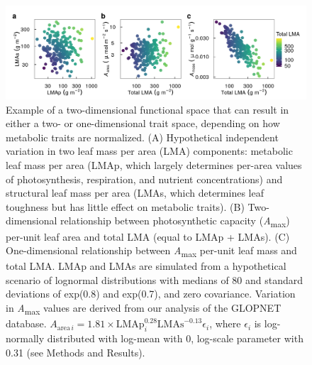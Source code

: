 \documentclass[
  12pt,
  a4paper,
,tablecaptionabove
]{scrartcl}
\begin{document}
\begin{figure}

{\centering \includegraphics{../figs/hypo.png}

}

\caption{\label{fig-Hplt}Example of a two-dimensional functional space
that can result in either a two- or one-dimensional trait space,
depending on how metabolic traits are normalized. (A) Hypothetical
independent variation in two leaf mass per area (LMA) components:
metabolic leaf mass per area (LMAp, which largely determines per-area
values of photosynthesis, respiration, and nutrient concentrations) and
structural leaf mass per area (LMAs, which determines leaf toughness but
has little effect on metabolic traits). (B) Two-dimensional relationship
between photosynthetic capacity (\emph{A}\textsubscript{max}) per-unit
leaf area and total LMA (equal to LMAp + LMAs). (C) One-dimensional
relationship between \emph{A}\textsubscript{max} per-unit leaf mass and
total LMA. LMAp and LMAs are simulated from a hypothetical scenario of
lognormal distributions with medians of 80 and standard deviations of
exp(0.8) and exp(0.7), and zero covariance. Variation in
\emph{A}\textsubscript{max} values are derived from our analysis of the
GLOPNET database.
\(A_{\mathrm{area} \, i}=1.81 \times \mathrm{LMAp}_i^{0.28}\mathrm{LMAs}^{-0.13}\epsilon_i\),
where \(\epsilon_i\) is log-normally distributed with log-mean with 0,
log-scale parameter with 0.31 (see Methods and Results).}

\end{figure}
\end{document}
